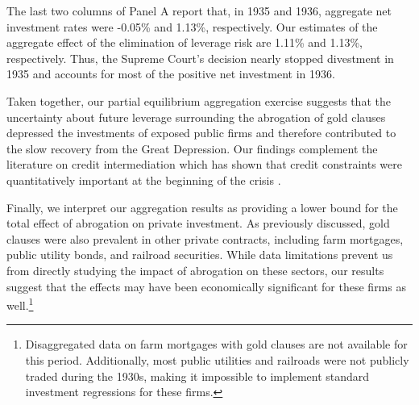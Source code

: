 The last two columns of Panel A report that, in 1935 and 1936, aggregate net investment rates were -0.05\% and 1.13\%, respectively. Our estimates of the aggregate effect of the elimination of leverage risk are 1.11\% and 1.13\%, respectively. Thus, the Supreme Court's decision nearly stopped divestment in 1935 and accounts for most of the positive net investment in 1936.

Taken together, our partial equilibrium aggregation exercise suggests that the uncertainty about future leverage surrounding the abrogation of gold clauses depressed the investments of exposed public firms and therefore contributed to the slow recovery from the Great Depression. Our findings complement the literature on credit intermediation which has shown that credit constraints were quantitatively important at the beginning of the crisis \cite{Benmelech2018}.

Finally, we interpret our aggregation results as providing a lower bound for the total effect of abrogation on private investment. As previously discussed, gold clauses were also prevalent in other private contracts, including farm mortgages, public utility bonds, and railroad securities. While data limitations prevent us from directly studying the impact of abrogation on these sectors, our results suggest that the effects may have been economically significant for these firms as well.\footnote{Disaggregated data on farm mortgages with gold clauses are not available for this period. Additionally, most public utilities and railroads were not publicly traded during the 1930s, making it impossible to implement standard investment regressions for these firms.}